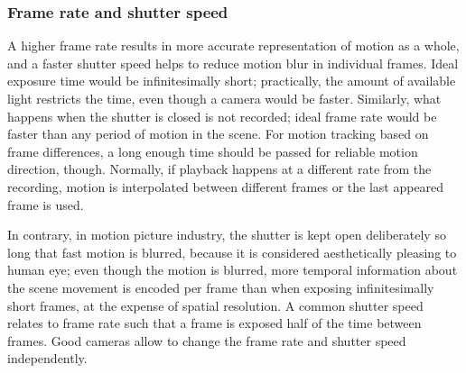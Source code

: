 

\subsubsection{Frame rate and shutter speed} %


A higher frame rate results in more accurate representation of motion as a whole, and a faster shutter speed helps to reduce motion blur in individual frames.
Ideal exposure time would be infinitesimally short; practically, the amount of available light restricts the time, even though a camera would be faster.
Similarly, what happens when the shutter is closed is not recorded; ideal frame rate would be faster than any period of motion in the scene.
For motion tracking based on frame differences, a long enough time should be passed for reliable motion direction, though.
Normally, if playback happens at a different rate from the recording, motion is interpolated between different frames or the last appeared frame is used.

In contrary, in motion picture industry, the shutter is kept open deliberately so long that fast motion is blurred, because it is considered aesthetically pleasing to human eye;
even though the motion is blurred, more temporal information about the scene movement is encoded per frame than when exposing infinitesimally short frames, at the expense of spatial resolution.
A common shutter speed relates to frame rate such that a frame is exposed half of the time between frames.
\cite{wilson2004anton}
Good cameras allow to change the frame rate and shutter speed independently.

